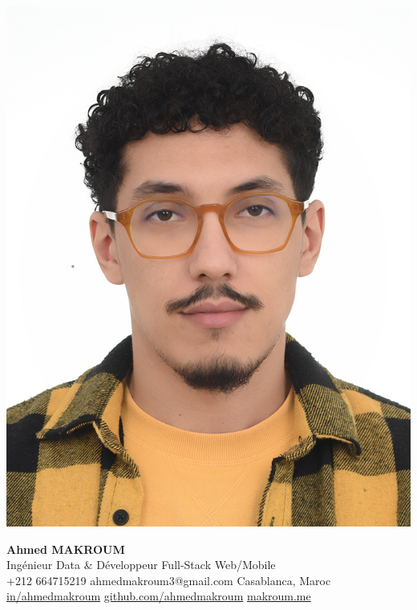 \documentclass[10pt,a4paper,sans]{moderncv}
\begin{document}
\hspace*{0.03\textwidth}%
\begin{minipage}[c]{0.13\textwidth}
  \includegraphics[width=0.85\linewidth]{images/ahmed.jpg}
\end{minipage}%
\hfill
\begin{minipage}[c]{0.84\textwidth}
  \begin{center}
    {\fontsize{20}{22}\selectfont\textbf{Ahmed MAKROUM}}\\
    {\fontsize{13.2}{15.4}\selectfont Ingénieur Data \& Développeur Full-Stack Web/Mobile} \\
    {\fontsize{10.5}{12.3}\selectfont
      \faMobile\enspace +212 664715219 \quad
      \faEnvelope\enspace ahmedmakroum3@gmail.com \quad
      \faHome\enspace Casablanca, Maroc \\
      \faLinkedin\enspace \href{https://www.linkedin.com/in/ahmed-makroum/}{in/ahmedmakroum} \quad
      \faGithub\enspace \href{https://github.com/ahmedmakroum}{github.com/ahmedmakroum}
      \faGlobe\enspace \href{https://ahmedmakroum.github.io/AhmedMakroumPortfolio/}{makroum.me}
    }
  \end{center}
\end{minipage}
\vspace{-10pt}
\end{document}
